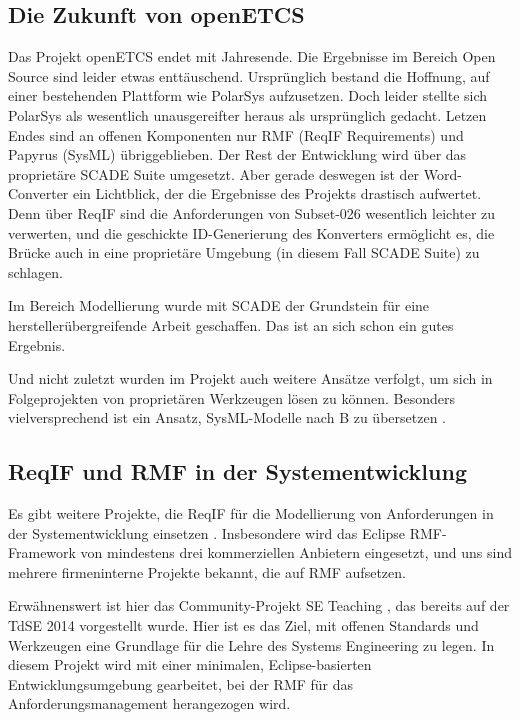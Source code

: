 \documentclass[twoside]{article}
\begin{document}
\begin{multicols}{2}
\section{Die Zukunft von openETCS}

Das Projekt openETCS endet mit Jahresende.  Die Ergebnisse im Bereich Open Source sind leider etwas enttäuschend.  Ursprünglich bestand die Hoffnung, auf einer bestehenden Plattform wie PolarSys aufzusetzen.  Doch leider stellte sich PolarSys als wesentlich unausgereifter heraus als ursprünglich gedacht.  Letzen Endes sind an offenen Komponenten nur RMF (ReqIF Requirements) und Papyrus (SysML) übriggeblieben.  Der Rest der Entwicklung wird über das proprietäre SCADE Suite umgesetzt.  Aber gerade deswegen ist der Word-Converter ein Lichtblick, der die Ergebnisse des Projekts drastisch aufwertet. Denn über ReqIF sind die Anforderungen von Subset-026 wesentlich leichter zu verwerten, und die geschickte ID-Generierung des Konverters ermöglicht es, die Brücke auch in eine proprietäre Umgebung (in diesem Fall SCADE Suite) zu schlagen.

Im Bereich Modellierung wurde mit SCADE der Grundstein für eine herstellerübergreifende Arbeit geschaffen.  Das ist an sich schon ein gutes Ergebnis.  

Und nicht zuletzt wurden im Projekt auch weitere Ansätze verfolgt, um sich in Folgeprojekten von proprietären Werkzeugen lösen zu können.  Besonders vielversprechend ist ein Ansatz, SysML-Modelle nach B zu übersetzen \cite{sysml2b}. 

\subsection{ReqIF und RMF in der Systementwicklung}

Es gibt weitere Projekte, die ReqIF für die Modellierung von Anforderungen in der Systementwicklung einsetzen \cite{reqifolution,ix,eclipse-teaching}.  Insbesondere wird das Eclipse RMF-Framework von mindestens drei kommerziellen Anbietern eingesetzt, und uns sind mehrere firmeninterne Projekte bekannt, die auf RMF aufsetzen.

Erwähnenswert ist hier das Community-Projekt SE Teaching \cite{se-teaching}, das bereits auf der TdSE 2014 vorgestellt wurde.  Hier ist es das Ziel, mit offenen Standards und Werkzeugen eine Grundlage für die Lehre des Systems Engineering zu legen.  In diesem Projekt wird mit einer minimalen, Eclipse-basierten Entwicklungsumgebung gearbeitet, bei der RMF für das Anforderungsmanagement herangezogen wird.


\end{multicols}
\end{document}
